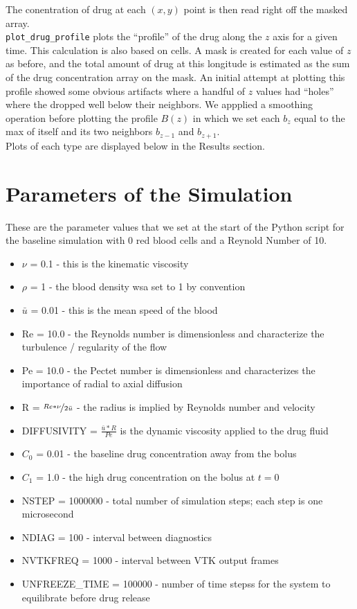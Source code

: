 \documentclass[11pt]{article} %
\newcommand{\tty}[1]{\texttt{#1}}
\begin{document}
The conentration of drug at each $(x, y)$ point is then read right off the masked array.\\
\tty{plot\_drug\_profile} plots the ``profile'' of the drug along the $z$ axis for a given time.
This calculation is also based on cells.  
A mask is created for each value of $z$ as before, and the total amount of drug 
at this longitude is estimated as the sum of the drug concentration array on the mask.
An initial attempt at plotting this profile showed some obvious artifacts where 
a handful of $z$ values had ``holes'' where the dropped well below their neighbors.
We appplied a smoothing operation before plotting the profile $B(z)$ in which 
we set each $b_z$ equal to the max of itself and its two neighbors $b_{z-1}$ and $b_{z+1}$.\\
Plots of each type are displayed below in the Results section.

\newpage
\section{Parameters of the Simulation}
These are the parameter values that we set at the start of the Python script for the baseline simulation
with 0 red blood cells and a Reynold Number of 10.
\begin{itemize}
\item $\nu$ = 0.1 - this is the kinematic viscosity
\item $\rho$ = 1 - the blood density wsa set to 1 by convention
\item $\bar{u}$ = 0.01 - this is the mean speed of the blood
\item Re = 10.0 - the Reynolds number is dimensionless and characterize the turbulence / regularity of the flow
\item Pe = 10.0 - the Pectet number is dimensionless and characterizes the importance of radial to axial diffusion
\item R = $\nicefrac{Re * \nu}{2  \bar{u}}$ - the radius is implied by Reynolds number and velocity
\item DIFFUSIVITY = $\frac{\bar{u} * R}{Pe}$ is the dynamic viscosity applied to the drug fluid
\item $C_0$ = 0.01 - the baseline drug concentration away from the bolus
\item $C_1$ = 1.0 - the high drug concentration on the bolus at $t=0$
\item NSTEP = 1000000 - total number of simulation steps; each step is one microsecond
\item NDIAG = 100 - interval between diagnostics
\item NVTKFREQ = 1000 - interval between VTK output frames
\item UNFREEZE\_TIME = 100000 - number of time stepss for the system to equilibrate before drug release
\end{itemize}
\end{document}
